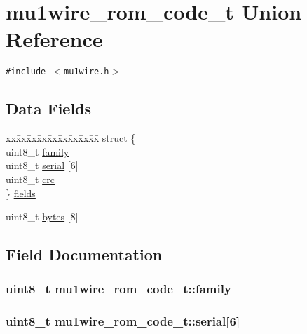 \hypertarget{unionmu1wire__rom__code__t}{
\section{mu1wire\_\-rom\_\-code\_\-t Union Reference}
\label{unionmu1wire__rom__code__t}
}
{\tt \#include $<$mu1wire.h$>$}

\subsection*{Data Fields}
\begin{CompactItemize}
\item 
\begin{tabbing}
xx\=xx\=xx\=xx\=xx\=xx\=xx\=xx\=xx\=\kill
struct \{\\
\>uint8\_t \hyperlink{unionmu1wire__rom__code__t_338c5242d61b9f419eb94933021fc237}{family}\\
\>uint8\_t \hyperlink{unionmu1wire__rom__code__t_6cdd799809f2da43fba40d929bea6d17}{serial} \mbox{[}6\mbox{]}\\
\>uint8\_t \hyperlink{unionmu1wire__rom__code__t_0280c907515345f652f53106d00d789a}{crc}\\
\} \hyperlink{unionmu1wire__rom__code__t_81b2c0cdfe4f51213f81a7158a389027}{fields}\\

\end{tabbing}\item 
uint8\_\-t \hyperlink{unionmu1wire__rom__code__t_39305b4006b16b1a6acef9b3193820f3}{bytes} \mbox{[}8\mbox{]}
\end{CompactItemize}


\subsection{Field Documentation}
\hypertarget{unionmu1wire__rom__code__t_338c5242d61b9f419eb94933021fc237}{
\subsubsection{\setlength{\rightskip}{0pt plus 5cm}uint8\_\-t {\bf mu1wire\_\-rom\_\-code\_\-t::family}}}
\label{unionmu1wire__rom__code__t_338c5242d61b9f419eb94933021fc237}


\hypertarget{unionmu1wire__rom__code__t_6cdd799809f2da43fba40d929bea6d17}{
\subsubsection{\setlength{\rightskip}{0pt plus 5cm}uint8\_\-t {\bf mu1wire\_\-rom\_\-code\_\-t::serial}\mbox{[}6\mbox{]}}}
\label{unionmu1wire__rom__code__t_6cdd799809f2da43fba40d929bea6d17}


